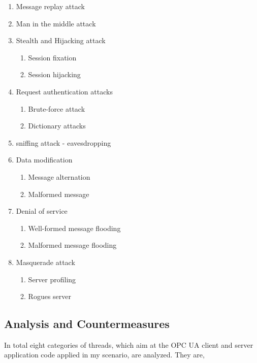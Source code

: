 \begin{enumerate}
	\item Message replay attack
	\item Man in the middle attack
	\item Stealth and Hijacking attack
  	\begin{enumerate}
    	\item Session fixation
	\item Session hijacking
	\end{enumerate}
		
    	\item Request authentication attacks
	\begin{enumerate}
		\item Brute-force attack
		\item Dictionary attacks
		\end{enumerate}
    	\item  sniffing attack - eavesdropping

	\item Data modification
		\begin{enumerate}
		\item Message alternation
		\item Malformed message
		\end{enumerate}
	
	\item Denial of service
		\begin{enumerate}
		\item Well-formed message flooding
		\item Malformed message flooding
		\end{enumerate}

	\item Masquerade attack
		\begin{enumerate}
		\item Server profiling
		\item Rogues server
		\end{enumerate}
\end{enumerate}
\subsection{Analysis and Countermeasures}
In total eight categories of threads, which aim at the OPC UA client and server application code applied in my scenario, are analyzed. They are,

